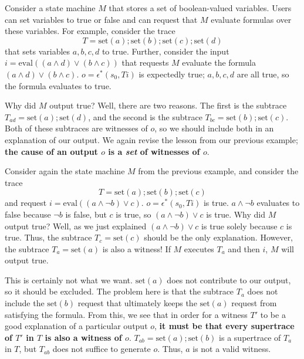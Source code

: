 \begin{example}
  \newcommand{\Mset}{\text{set}}
  \newcommand{\Meval}{\text{eval}}
  Consider a state machine $M$ that stores a set of boolean-valued variables.
  Users can set variables to true or false and can request that $M$ evaluate
  formulas over these variables. For example, consider the trace
  \[
    T = \Mset(a); \Mset(b); \Mset(c); \Mset(d)
  \]
  that sets variables $a, b, c, d$ to true. Further, consider the input $i =
  \Meval((a \land d) \lor (b \land c))$ that requests $M$ evaluate the formula
  $(a \land d) \lor (b \land c)$. $o = \epsilon^*(s_0, Ti)$ is expectedly true;
  $a, b, c, d$ are all true, so the formula evaluates to true.

  Why did $M$ output true? Well, there are two reasons. The first is the
  subtrace $T_{ad} = \Mset(a); \Mset(d)$, and the second is the subtrace
  $T_{bc} = \Mset(b); \Mset(c)$. Both of these subtraces are witnesses of $o$,
  so we should include both in an explanation of our output. We again revise
  the lesson from our previous example; \textbf{the cause of an output $o$ is a
  \emph{set} of witnesses of $o$}.
\end{example}

\begin{example}
  \newcommand{\Mset}{\text{set}}
  \newcommand{\Meval}{\text{eval}}
  Consider again the state machine $M$ from the previous example, and consider
  the trace
  \[
    T = \Mset(a); \Mset(b); \Mset(c)
  \]
  and request $i = \Meval((a \land \lnot b) \lor c)$. $o = \epsilon^*(s_0, Ti)$
  is true. $a \land \lnot b$ evaluates to false because $\lnot b$ is false, but
  $c$ is true, so $(a \land \lnot b) \lor c$ is true.
  Why did $M$ output true? Well, as we just explained $(a \land \lnot b) \lor
  c$ is true solely because $c$ is true. Thus, the subtrace $T_c = \Mset(c)$
  should be the only explanation. However, the subtrace $T_a = \Mset(a)$ is
  also a witness! If $M$ executes $T_a$ and then $i$, $M$ will output true.

  This is certainly not what we want. $\Mset(a)$ does not contribute to our
  output, so it should be excluded. The problem here is that the subtrace $T_a$
  does not include the $\Mset(b)$ request that ultimately keeps the
  $\Mset(a)$ request from satisfying the formula. From this, we see that in order for a witness $T'$ to be
  a good explanation of a particular output $o$, \textbf{it must be that every
  supertrace of $T'$ in $T$ is also a witness of $o$}. $T_{ab} = \Mset(a);
  \Mset(b)$ is a supertrace of $T_a$ in $T$, but $T_{ab}$ does not suffice to
  generate $o$. Thus, $a$ is not a valid witness.
\end{example}

